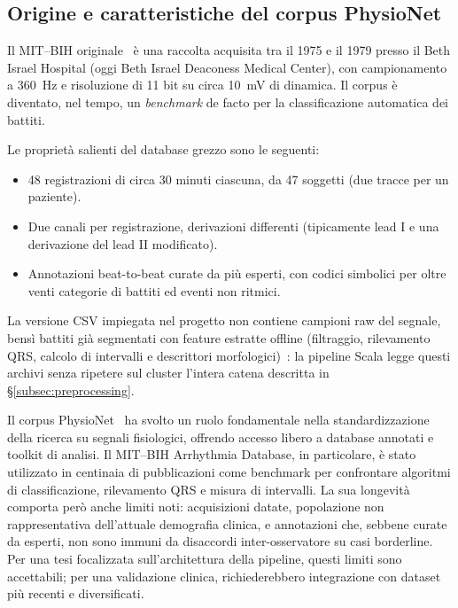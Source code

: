 \subsection{Origine e caratteristiche del corpus PhysioNet}

Il MIT--BIH originale~\cite{moody2001impact,goldberger2000physiobank} è una raccolta acquisita tra il 1975 e il 1979 presso il Beth Israel Hospital (oggi Beth Israel Deaconess Medical Center), con campionamento a 360~Hz e risoluzione di 11 bit su circa 10~mV di dinamica.
Il corpus è diventato, nel tempo, un \emph{benchmark} de facto per la classificazione automatica dei battiti.

Le proprietà salienti del database grezzo sono le seguenti:
\begin{itemize}
  \item 48 registrazioni di circa 30 minuti ciascuna, da 47 soggetti (due tracce per un paziente).
  \item Due canali per registrazione, derivazioni differenti (tipicamente lead I e una derivazione del lead II modificato).
  \item Annotazioni beat-to-beat curate da più esperti, con codici simbolici per oltre venti categorie di battiti ed eventi non ritmici.
\end{itemize}

La versione CSV impiegata nel progetto non contiene campioni raw del segnale, bensì battiti già segmentati con feature estratte offline (filtraggio, rilevamento QRS, calcolo di intervalli e descrittori morfologici)~\cite{sakib2021edge,dechazal2004automatic}: la pipeline Scala legge questi archivi senza ripetere sul cluster l'intera catena descritta in \S\ref{subsec:preprocessing}.

Il corpus PhysioNet~\cite{goldberger2000physiobank} ha svolto un ruolo fondamentale nella standardizzazione della ricerca su segnali fisiologici, offrendo accesso libero a database annotati e toolkit di analisi.
Il MIT--BIH Arrhythmia Database, in particolare, è stato utilizzato in centinaia di pubblicazioni come benchmark per confrontare algoritmi di classificazione, rilevamento QRS e misura di intervalli.
La sua longevità comporta però anche limiti noti: acquisizioni datate, popolazione non rappresentativa dell'attuale demografia clinica, e annotazioni che, sebbene curate da esperti, non sono immuni da disaccordi inter-osservatore su casi borderline.
Per una tesi focalizzata sull'architettura della pipeline, questi limiti sono accettabili; per una validazione clinica, richiederebbero integrazione con dataset più recenti e diversificati.

